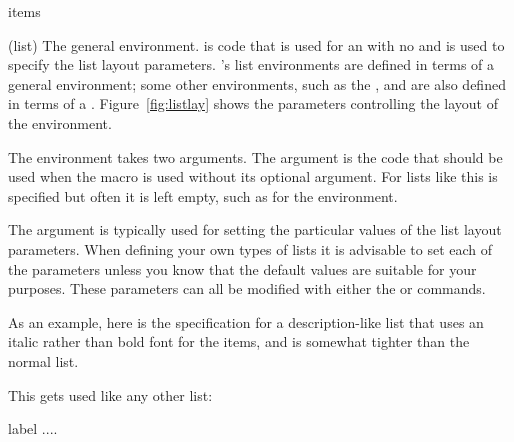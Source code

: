 
\begin{syntax}
 items  \\
\end{syntax}
\glossary(list)%
  {}%
  {The general  environment.  is code that is
   used for an  with no  and  is used to
   specify the list layout parameters.}
\ltx's list environments are defined in terms of a general 
environment; some other environments, such as the , 
and  are also defined in terms of a .
Figure~\ref{fig:listlay} shows the parameters controlling the layout
of the  environment.

    The  environment takes two arguments. The 
argument is the code that should be used when the \cmd{\item} macro is
used without its optional  argument. For lists like 
this is specified but often it is left empty, such as for the 
environment.

    The  argument is typically used for setting the particular
values of the list layout parameters. When defining your own types of lists
it is advisable to set each of the parameters unless you know that the default
values are suitable for your purposes. These parameters can all be modified
with either the \cmd{\setlength} or \cmd{\addtolength} commands.

    As an example, here is the specification for a description-like list
that uses an italic rather than bold font for the items, and is somewhat
tighter than the normal  list.

\begin{lcode}
\newcommand{\itlabel}[1]{\hspace\labelsep\normalfont\itshape #1}
\newenvironment{itdesc}{%
  \list{}{%
    \setlength{\labelsep}{0.5em}
    \setlength{\itemindent}{0pt}
    \setlength{\leftmargin}{\parindent} 
    \setlength{\labelwidth}{\leftmargin}
    \addtolength{\labelwidth}{-\labelsep}
    \setlength{\listparindent}{\parindent}
    \setlength{\parsep}{\parskip}
    \setlength{\itemsep}{0.5\onelineskip}
    \let\makelabel\itlabel}}{\endlist}
\end{lcode}

    This gets used like any other list:
\begin{lcode}
\begin{itdesc}
\item[label] ....
\end{itdesc}
\end{lcode}

